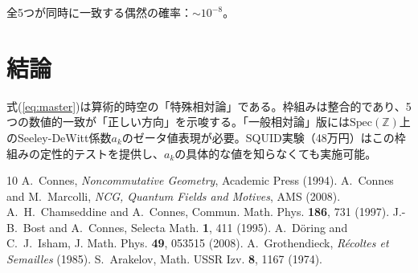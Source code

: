 \documentclass[11pt,a4paper]{article}
\newcommand{\Spec}{\mathrm{Spec}}
\begin{document}
全5つが同時に一致する偶然の確率：$\sim 10^{-8}$。

\section{結論}

式(\ref{eq:master})は算術的時空の「特殊相対論」である。枠組みは整合的であり、5つの数値的一致が「正しい方向」を示唆する。「一般相対論」版には$\Spec(\mathbb{Z})$上のSeeley-DeWitt係数$a_k$のゼータ値表現が必要。SQUID実験（48万円）はこの枠組みの定性的テストを提供し、$a_k$の具体的な値を知らなくても実施可能。

\begin{thebibliography}{10}
 A.~Connes, \emph{Noncommutative Geometry}, Academic Press (1994).
 A.~Connes and M.~Marcolli, \emph{NCG, Quantum Fields and Motives}, AMS (2008).
 A.~H.~Chamseddine and A.~Connes, Commun. Math. Phys. \textbf{186}, 731 (1997).
 J.-B.~Bost and A.~Connes, Selecta Math. \textbf{1}, 411 (1995).
 A.~Döring and C.~J.~Isham, J. Math. Phys. \textbf{49}, 053515 (2008).
 A.~Grothendieck, \emph{Récoltes et Semailles} (1985).
 S.~Arakelov, Math. USSR Izv. \textbf{8}, 1167 (1974).
\end{thebibliography}
\end{document}
